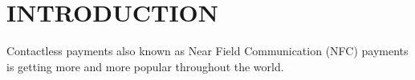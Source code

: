 \chapter{INTRODUCTION}
\label{chapter:introduction}

Contactless payments also known as Near Field Communication \cite{want2011near}
(NFC) payments is getting more and more popular throughout the
world. 
